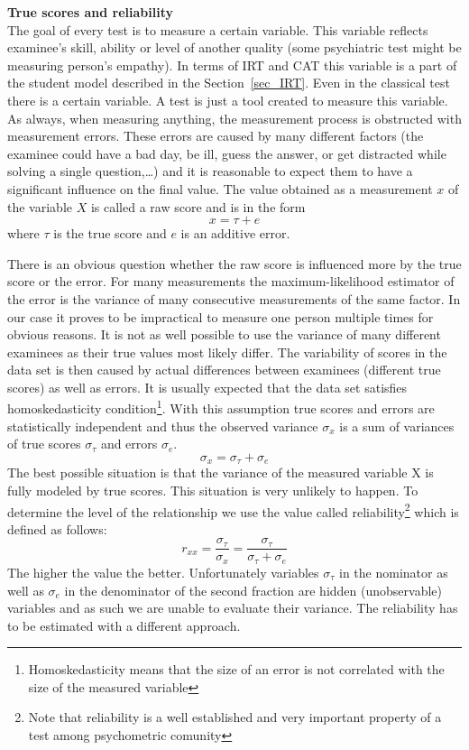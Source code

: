 \textbf{True scores and reliability}\\
The goal of every test is to measure a certain variable. This variable reflects examinee's skill, ability or level of another quality (some psychiatric test might be measuring person's empathy). In terms of IRT and CAT this variable is a part of the student model described in the Section~\ref{sec_IRT}. Even in the classical test there is a certain variable. A test is just a tool created to measure this variable. As always, when measuring anything, the measurement process is obstructed with measurement errors. These errors are caused by many different factors (the examinee could have a bad day, be ill, guess the answer, or get distracted while solving a single question,\ldots) and it is reasonable to expect them to have a significant influence on the final value. The value obtained as a measurement $x$ of the variable $X$ is called a raw score and is in the form
$$x = \tau + e$$
where $\tau$ is the true score and $e$ is an additive error. 

There is an obvious question whether the raw score is influenced more by the true score or the error. For many measurements the maximum-likelihood estimator of the error is the variance of many consecutive measurements of the same factor. In our case it proves to be impractical to measure one person multiple times for obvious reasons. It is not as well possible to use the variance of many different examinees as their true values most likely differ. The variability of scores in the data set is then caused by actual differences between examinees (different true scores) as well as errors. It is usually expected that the data set satisfies homoskedasticity condition\footnote{Homoskedasticity means that the size of an error is not correlated with the size of the measured variable}. With this assumption true scores and errors are statistically independent and thus the observed variance $\sigma_x$ is a sum of variances of true scores $\sigma_\tau$ and errors $\sigma_e$.
$$\sigma_x=\sigma_\tau+\sigma_e$$
The best possible situation is that the variance of the measured variable X is fully modeled by true scores. This situation is very unlikely to happen. To determine the level of the relationship we use the value called reliability\footnote{Note that reliability is a well established and very important property of a test among psychometric comunity} which is defined as follows:
$$r_{xx} = \frac{\sigma_\tau}{\sigma_x}=\frac{\sigma_\tau}{\sigma_\tau+\sigma_e}$$
The higher the value the better. Unfortunately variables $\sigma_\tau$ in the nominator as well as $\sigma_e$ in the denominator of the second fraction are hidden (unobservable) variables and as such we are unable to evaluate their variance. The reliability has to be estimated with a different approach. 

